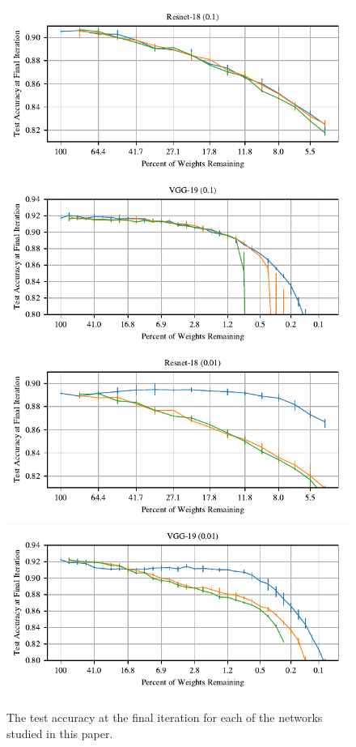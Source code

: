 \begin{figure}
\includegraphics[width=.5\textwidth]{graphs/cifar10/icml/resnet18-iclr-rearr-29900-0.1/accuracy}%
\includegraphics[width=.5\textwidth]{graphs/cifar10/icml/vgg19-iclr-rearr-112000-0.1/accuracy}
\includegraphics[width=.5\textwidth]{graphs/cifar10/icml/resnet18-iclr-rearr-29900-0.01/accuracy}%
\includegraphics[width=.5\textwidth]{graphs/cifar10/icml/vgg19-iclr-rearr-112000-0.01/accuracy}
\caption{The test accuracy at the final iteration for each of the networks studied in this paper.}
\label{fig:random-app}
\end{figure}